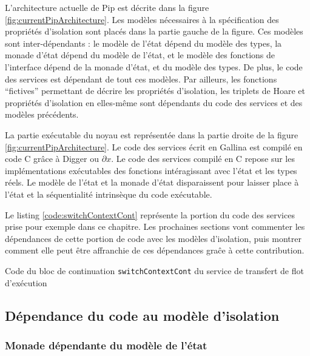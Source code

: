 			L'architecture actuelle de Pip est décrite dans la figure \ref{fig:currentPipArchitecture}. Les modèles nécessaires à la spécification des propriétés d'isolation sont placés dans la partie gauche de la figure. Ces modèles sont inter-dépendants : le modèle de l'état dépend du modèle des types, la monade d'état dépend du modèle de l'état, et le modèle des fonctions de l'interface dépend de la monade d'état, et du modèle des types. De plus, le code des services est dépendant de tout ces modèles. Par ailleurs, les fonctions ``fictives'' permettant de décrire les propriétés d'isolation, les triplets de Hoare et propriétés d'isolation en elles-même sont dépendants du code des services et des modèles précédents.

			La partie exécutable du noyau est représentée dans la partie droite de la figure \ref{fig:currentPipArchitecture}. Le code des services écrit en Gallina est compilé en code C grâce à Digger ou $\partial x$. Le code des services compilé en C repose sur les implémentations exécutables des fonctions intéragissant avec l'état et les types réels. Le modèle de l'état et la monade d'état disparaissent pour laisser place à l'état et la séquentialité intrinsèque du code exécutable.

			Le listing \ref{code:switchContextCont} représente la portion du code des services prise pour exemple dans ce chapitre. Les prochaines sections vont commenter les dépendances de cette portion de code avec les modèles d'isolation, puis montrer comment elle peut être affranchie de ces dépendances graĉe à cette contribution.
			\begin{listing}[!ht]
				\caption{Code du bloc de continuation \texttt{switchContextCont} du service de transfert de flot d'exécution}
				\label{code:switchContextCont}
			\end{listing}

		\subsection{Dépendance du code au modèle d'isolation}

			\subsubsection{Monade dépendante du modèle de l'état}

